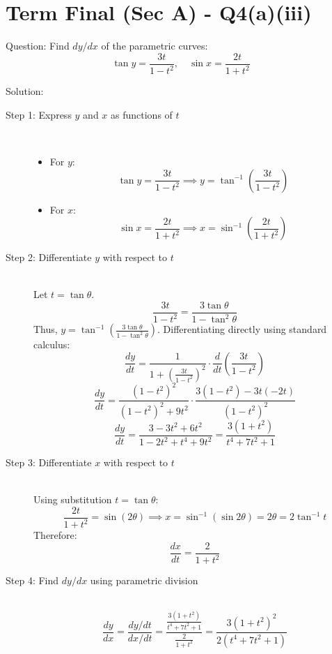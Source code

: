 \documentclass[11pt, a4paper]{article}
\begin{document}


\section*{Term Final (Sec A) - Q4(a)(iii)}

Question:
Find $dy/dx$ of the parametric curves:
\[ \tan y = \frac{3t}{1-t^2}, \quad \sin x = \frac{2t}{1+t^2} \]

Solution:

\begin{description}
    \item[Step 1: Express $y$ and $x$ as functions of $t$] \ 
    \begin{itemize}
        \item For $y$:
        \[ \tan y = \frac{3t}{1-t^2} \implies y = \tan^{-1}\left(\frac{3t}{1-t^2}\right) \]
        
        \item For $x$:
        \[ \sin x = \frac{2t}{1+t^2} \implies x = \sin^{-1}\left(\frac{2t}{1+t^2}\right) \]
    \end{itemize}

    \item[Step 2: Differentiate $y$ with respect to $t$] \ \\
    Let $t = \tan \theta$.
    \[ \frac{3t}{1-t^2} = \frac{3\tan\theta}{1-\tan^2\theta} \]
    Thus, $y = \tan^{-1}\left(\frac{3\tan\theta}{1-\tan^2\theta}\right)$. Differentiating directly using standard calculus:
    \[ \frac{dy}{dt} = \frac{1}{1 + \left(\frac{3t}{1-t^2}\right)^2} \cdot \frac{d}{dt}\left(\frac{3t}{1-t^2}\right) \]
    \[ \frac{dy}{dt} = \frac{(1-t^2)^2}{(1-t^2)^2 + 9t^2} \cdot \frac{3(1-t^2) - 3t(-2t)}{(1-t^2)^2} \]
    \[ \frac{dy}{dt} = \frac{3 - 3t^2 + 6t^2}{1 - 2t^2 + t^4 + 9t^2} = \frac{3(1+t^2)}{t^4 + 7t^2 + 1} \]

    \item[Step 3: Differentiate $x$ with respect to $t$] \ \\
    Using substitution $t = \tan \theta$:
    \[ \frac{2t}{1+t^2} = \sin(2\theta) \implies x = \sin^{-1}(\sin 2\theta) = 2\theta = 2\tan^{-1}t \]
    Therefore:
    \[ \frac{dx}{dt} = \frac{2}{1+t^2} \]

    \item[Step 4: Find $dy/dx$ using parametric division] \ \\
    \[ \frac{dy}{dx} = \frac{dy/dt}{dx/dt} = \frac{\frac{3(1+t^2)}{t^4 + 7t^2 + 1}}{\frac{2}{1+t^2}} = \frac{3(1+t^2)^2}{2(t^4 + 7t^2 + 1)} \]
\end{description}
\end{document}
